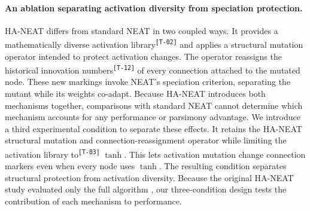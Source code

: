 \documentclass[12pt]{article}
\newcommand{\revID}[1]{\textsuperscript{\scriptsize\texttt{[#1]}}}
\newcommand{\revTerm}[2]{\textcolor{lrTeal}{#2}\revID{#1}}      %
\begin{document}

\paragraph{An ablation separating activation diversity from speciation protection.}
HA-NEAT \parencite{hagg_evolving_2017} differs from standard NEAT \parencite{stanley_evolving_2002} in two coupled ways. 
It provides \revTerm{T-02}{a mathematically diverse activation library} and applies a structural mutation operator intended to protect activation changes. 
The operator \revTerm{T-12}{reassigns the historical innovation numbers} of every connection attached to the mutated node. 
These new markings invoke NEAT's speciation criterion, separating the mutant while its weights co-adapt. 
Because HA-NEAT introduces both mechanisms together, comparisons with standard NEAT cannot determine which mechanism accounts for any performance or parsimony advantage.
We introduce a third experimental condition to separate these effects. 
It retains the HA-NEAT structural mutation and connection-reassignment operator while \revTerm{T-03}{limiting the activation library to} $\tanh$. 
This lets activation mutation change connection markers even when every node uses $\tanh$.
The resulting condition separates structural protection from activation diversity. 
Because the original HA-NEAT study evaluated only the full algorithm \parencite{hagg_evolving_2017}, our three-condition design tests the contribution of each mechanism to performance.
\end{document}
